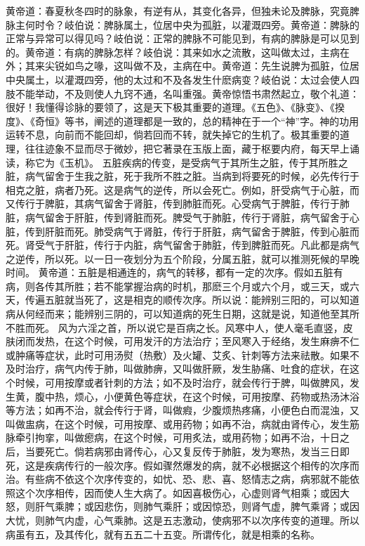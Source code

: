 \documentclass[a4paper,12pt,UTF8,twoside]{ctexbook}
\begin{document}
黄帝道：春夏秋冬四时的脉象，有逆有从，其变化各异，但独未论及脾脉，究竟脾脉主何时令？岐伯说：脾脉属土，位居中央为孤脏，以灌溉四旁。黄帝道：脾脉的正常与异常可以得见吗？岐伯说：正常的脾脉不可能见到，有病的脾脉是可以见到的。黄帝道：有病的脾脉怎样？岐伯说：其来如水之流散，这叫做太过，主病在外；其来尖锐如鸟之喙，这叫做不及，主病在中。黄帝道：先生说脾为孤脏，位居中央属土，以灌溉四旁，他的太过和不及各发生什麽病变？岐伯说：太过会使人四肢不能举动，不及则使人九窍不通，名叫重强。黄帝惊悟书肃然起立，敬个礼道：很好！我懂得诊脉的要领了，这是天下极其重要的道理。《五色》、《脉变》、《揆度》、《奇恒》等书，阐述的道理都是一致的，总的精神在于一个“神”字。神的功用运转不息，向前而不能回却，倘若回而不转，就失掉它的生机了。极其重要的道理，往往迹象不显而尽于微妙，把它著录在玉版上面，藏于枢要内府，每天早上诵读，称它为《玉机》。
五脏疾病的传变，是受病气于其所生之脏，传于其所胜之脏，病气留舍于生我之脏，死于我所不胜之脏。当病到将要死的时候，必先传行于相克之脏，病者乃死。这是病气的逆传，所以会死亡。例如，肝受病气于心脏，而又传行于脾脏，其病气留舍于肾脏，传到肺脏而死。心受病气于脾脏，传行于肺脏，病气留舍于肝脏，传到肾脏而死。脾受气于肺脏，传行于肾脏，病气留舍于心脏，传到肝脏而死。肺受病气于肾脏，传行于肝脏，病气留舍于脾脏，传到心脏而死。肾受气于肝脏，传行于内脏，病气留舍于肺脏，传到脾脏而死。凡此都是病气之逆传，所以死。以一日一夜划分为五个阶段，分属五脏，就可以推测死候的早晚时间。
黄帝道：五脏是相通连的，病气的转移，都有一定的次序。假如五脏有病，则各传其所胜；若不能掌握治病的时机，那麽三个月或六个月，或三天，或六天，传遍五脏就当死了，这是相克的顺传次序。所以说：能辨别三阳的，可以知道病从何经而来；能辨别三阴的，可以知道病的死生日期，这就是说，知道他至其所不胜而死。
风为六淫之首，所以说它是百病之长。风寒中人，使人毫毛直竖，皮肤闭而发热，在这个时候，可用发汗的方法治疗；至风寒入于经络，发生麻痹不仁或肿痛等症状，此时可用汤熨（热敷）及火罐、艾炙、针刺等方法来祛散。如果不及时治疗，病气内传于肺，叫做肺痹，又叫做肝厥，发生胁痛、吐食的症状，在这个时候，可用按摩或者针刺的方法；如不及时治疗，就会传行于脾，叫做脾风，发生黄，腹中热，烦心，小便黄色等症状，在这个时候，可用按摩、药物或热汤沐浴等方法；如再不治，就会传行于肾，叫做瘕，少腹烦热疼痛，小便色白而混浊，又叫做盅病，在这个时候，可用按摩、或用药物；如再不治，病就由肾传心，发生筋脉牵引拘挛，叫做瘛病，在这个时候，可用炙法，或用药物；如再不治，十日之后，当要死亡。倘若病邪由肾传心，心又复反传于肺脏，发为寒热，发当三日即死，这是疾病传行的一般次序。假如骤然爆发的病，就不必根据这个相传的次序而治。有些病不依这个次序传变的，如忧、恐、悲、喜、怒情志之病，病邪就不能依照这个次序相传，因而使人生大病了。如因喜极伤心，心虚则肾气相乘；或因大怒，则肝气乘脾；或因悲伤，则肺气乘肝；或因惊恐，则肾气虚，脾气乘肾；或因大忧，则肺气内虚，心气乘肺。这是五志激动，使病邪不以次序传变的道理。所以病虽有五，及其传化，就有五五二十五变。所谓传化，就是相乘的名称。
\end{document}
